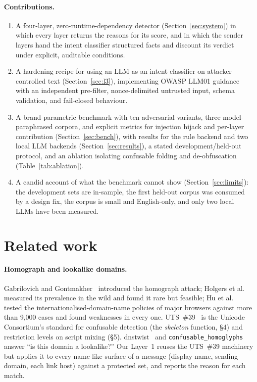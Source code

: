 \documentclass[10pt,twocolumn]{article}
\newcommand{\code}[1]{\texttt{#1}}
\begin{document}
\paragraph{Contributions.}
\begin{enumerate}
\item A four-layer, zero-runtime-dependency detector (Section~\ref{sec:system}) in which every layer returns the reasons for its score, and in which the sender layers hand the intent classifier structured facts and discount its verdict under explicit, auditable conditions.
\item A hardening recipe for using an LLM as an intent classifier on attacker-controlled text (Section~\ref{sec:l3}), implementing OWASP LLM01 guidance with an independent pre-filter, nonce-delimited untrusted input, schema validation, and fail-closed behaviour.
\item A brand-parametric benchmark with ten adversarial variants, three model-paraphrased corpora, and explicit metrics for injection hijack and per-layer contribution (Section~\ref{sec:bench}), with results for the rule backend and two local LLM backends (Section~\ref{sec:results}), a stated development/held-out protocol, and an ablation isolating confusable folding and de-obfuscation (Table~\ref{tab:ablation}).
\item A candid account of what the benchmark cannot show (Section~\ref{sec:limits}): the development sets are in-sample, the first held-out corpus was consumed by a design fix, the corpus is small and English-only, and only two local LLMs have been measured.
\end{enumerate}

\section{Related work}
\label{sec:related}

\paragraph{Homograph and lookalike domains.}
Gabrilovich and Gontmakher~\cite{gabrilovich2002homograph} introduced the homograph attack; Holgers et al.~\cite{holgers2006cutting} measured its prevalence in the wild and found it rare but feasible; Hu et al.~\cite{hu2021idn} tested the internationalised-domain-name policies of major browsers against more than 9{,}000 cases and found weaknesses in every one. UTS~\#39~\cite{uts39} is the Unicode Consortium's standard for confusable detection (the \emph{skeleton} function, \S4) and restriction levels on script mixing (\S5). dnstwist~\cite{dnstwist} and \code{confusable\_homoglyphs}~\cite{confusablehomoglyphs} answer ``is this domain a lookalike?'' Our Layer~1 reuses the UTS~\#39 machinery but applies it to every name-like surface of a message (display name, sending domain, each link host) against a protected set, and reports the reason for each match.
\end{document}
